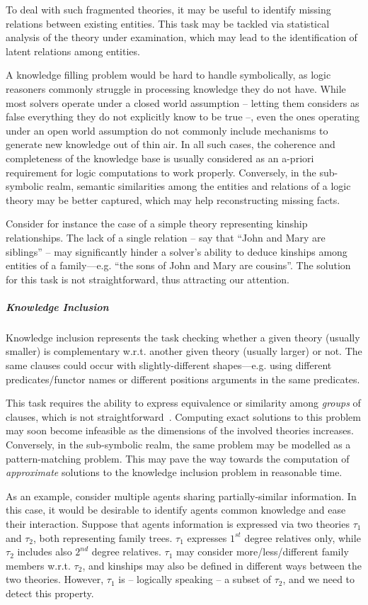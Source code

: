 \documentclass[12pt,a4paper,openright,twoside]{book}
\begin{document}
To deal with such fragmented theories, it may be useful to identify missing relations between existing entities.
%
This task may be tackled via statistical analysis of the theory under examination, which may lead to the identification of latent relations among entities.

A knowledge filling problem would be hard to handle symbolically, as logic reasoners commonly struggle in processing knowledge they do not have.
%
While most solvers operate under a closed world assumption -- letting them considers as false everything they do not explicitly know to be true --, even the ones operating under an open world assumption do not commonly include mechanisms to generate new knowledge out of thin air.
%
In all such cases, the coherence and completeness of the knowledge base is usually considered as an a-priori requirement for logic computations to work properly.
%
Conversely, in the sub-symbolic realm, semantic similarities among the entities and relations of a logic theory may be better captured, which may help reconstructing missing facts.

Consider for instance the case of a simple theory representing kinship relationships.
%
The lack of a single relation -- say that ``John and Mary are siblings'' -- may significantly hinder a solver's ability to deduce kinships among entities of a family---e.g. ``the sons of John and Mary are cousins''.
%
The solution for this task is not straightforward, thus attracting our attention.

\subparagraph{Knowledge Inclusion}

Knowledge inclusion represents the task checking whether a given theory (usually smaller) is complementary w.r.t. another given theory (usually larger) or not.
%
The same clauses could occur with slightly-different shapes---e.g. using different predicates/functor names or different positions arguments in the same predicates.

This task requires the ability to express equivalence or similarity among \emph{groups} of clauses, which is not straightforward~\cite{EiterLpmr2004, JiIjcai2015}.
%
Computing exact solutions to this problem may soon become infeasible as the dimensions of the involved theories increases.
%
Conversely, in the sub-symbolic realm, the same problem may be modelled as a pattern-matching problem.
%
This may pave the way towards the computation of \emph{approximate} solutions to the knowledge inclusion problem in reasonable time.

As an example, consider multiple agents sharing partially-similar information. In this case, it would be desirable to identify agents common knowledge and ease their interaction.
%
Suppose that agents information is expressed via two theories $\tau_1$ and $\tau_2$, both representing family trees.
%
$\tau_1$ expresses $1^{st}$ degree relatives only, while $\tau_2$ includes also $2^{nd}$ degree relatives.
%
$\tau_1$ may consider more/less/different family members w.r.t. $\tau_2$, and kinships may also be defined in different ways between the two theories.
%
However, $\tau_1$ is -- logically speaking -- a subset of $\tau_2$, and we need to detect this property.
\end{document}
